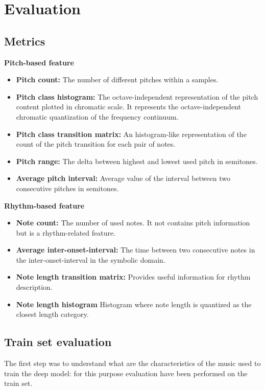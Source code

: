 \documentclass[10pt,twocolumn,letterpaper]{article}
\begin{document}
\section{Evaluation}


\subsection{Metrics}

\textbf{Pitch-based feature}
\begin{itemize}
    \item \textbf{Pitch count:} The number of different pitches within a samples.
    \item \textbf{Pitch class histogram:} The octave-independent representation of the pitch content plotted in chromatic scale. It  represents the octave-independent chromatic quantization of the frequency continuum.
    \item \textbf{Pitch class transition matrix:} An histogram-like representation of the count of the pitch transition for each pair of notes.
    \item \textbf{Pitch range:} The delta between highest and lowest used pitch in semitones.
    \item \textbf{Average pitch interval:} Average value of the interval between two consecutive pitches in semitones.
\end{itemize}
\textbf{Rhythm-based feature}
\begin{itemize}
    \item \textbf{Note count:} The number of used notes. It not contains pitch information but is a rhythm-related feature.
    \item \textbf{Average inter-onset-interval:} The time between two consecutive notes in the inter-onset-interval in the symbolic domain.
    \item \textbf{Note length transition matrix:} Provides useful information for rhythm description.
    \item \textbf{Note length histogram} Histogram where note length is quantized as the closest length category.
\end{itemize}

\subsection{Train set evaluation}
The first step was to understand what are the characteristics of the music used to train the deep model: for this purpose evaluation have been performed on the train set.
\end{document}
